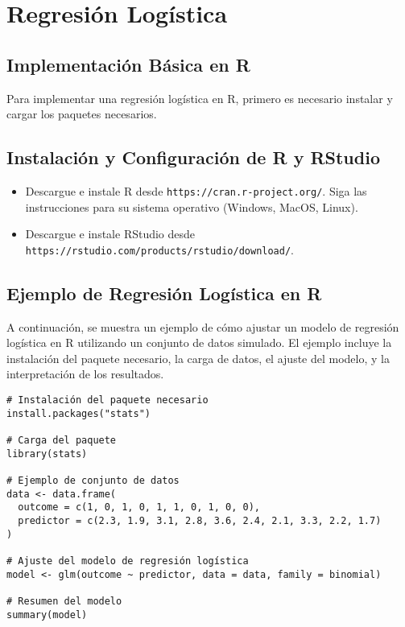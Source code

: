 \section{Regresión Logística}

\subsection*{Implementación Básica en R}

Para implementar una regresión logística en R, primero es necesario instalar y cargar los paquetes necesarios.

\subsection*{Instalación y Configuración de R y RStudio}
\begin{itemize}
    \item Descargue e instale R desde \texttt{https://cran.r-project.org/}. Siga las instrucciones para su sistema operativo (Windows, MacOS, Linux).
    \item Descargue e instale RStudio desde \texttt{https://rstudio.com/products/rstudio/download/}. 
\end{itemize}

\subsection{Ejemplo de Regresión Logística en R}

A continuación, se muestra un ejemplo de cómo ajustar un modelo de regresión logística en R utilizando un conjunto de datos simulado. El ejemplo incluye la instalación del paquete necesario, la carga de datos, el ajuste del modelo, y la interpretación de los resultados.

\begin{verbatim}
# Instalación del paquete necesario
install.packages("stats")

# Carga del paquete
library(stats)

# Ejemplo de conjunto de datos
data <- data.frame(
  outcome = c(1, 0, 1, 0, 1, 1, 0, 1, 0, 0),
  predictor = c(2.3, 1.9, 3.1, 2.8, 3.6, 2.4, 2.1, 3.3, 2.2, 1.7)
)

# Ajuste del modelo de regresión logística
model <- glm(outcome ~ predictor, data = data, family = binomial)

# Resumen del modelo
summary(model)
\end{verbatim}

